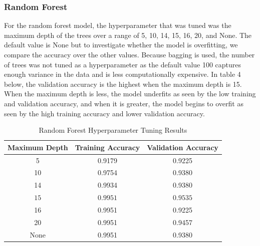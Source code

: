 \documentclass[12pt]{article}
\begin{document}
\subsubsection*{Random Forest} For the random forest model, the hyperparameter that was tuned was the maximum depth of the trees over a range of 5, 10, 14, 15, 16, 20, and None. The default value is None but to investigate whether the model is overfitting, we compare the accuracy over the other values. Because bagging is used, the number of trees was not tuned as a hyperparameter as the default value 100 captures enough variance in the data and is less computationally expensive. In table 4 below, the validation accuracy is the highest when the maximum depth is 15. When the maximum depth is less, the model underfits as seen by the low training and validation accuracy, and when it is greater, the model begins to overfit as seen by the high training accuracy and lower validation accuracy.
\begin{table}[h]
    \centering
    \caption{Random Forest Hyperparameter Tuning Results}
    \label{tab:rf_tuning}
    \begin{tabular}{c c c}
        \hline
        \textbf{Maximum Depth} & \textbf{Training Accuracy} & \textbf{Validation Accuracy} \\
        \hline
        5    & 0.9179 & 0.9225 \\
        10   & 0.9754 & 0.9380 \\
        14   & 0.9934 & 0.9380 \\
        $\boxed{15}$ & $\boxed{0.9951}$ & $\boxed{0.9535}$ \\
        16   & 0.9951 & 0.9225 \\
        20   & 0.9951 & 0.9457 \\
        None & 0.9951 & 0.9380 \\
        \hline
    \end{tabular}
\end{table}
\end{document}
